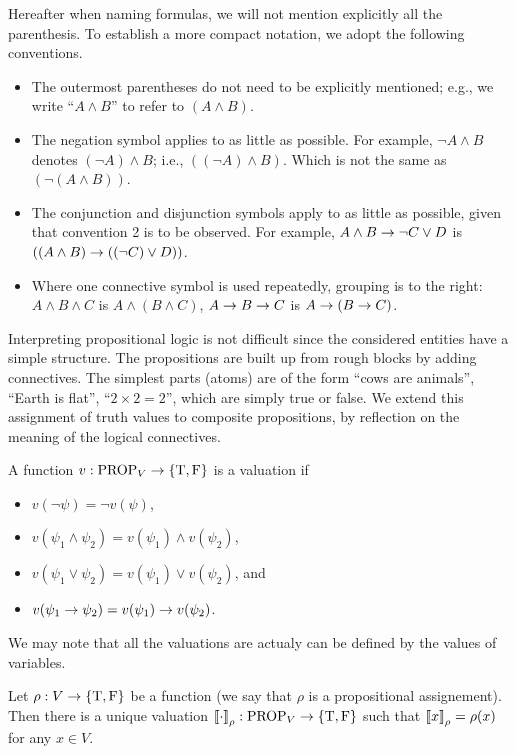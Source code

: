 Hereafter when naming formulas, we will not mention explicitly all the
parenthesis. To establish a more compact notation, we adopt the following
conventions.
\begin{itemize}
  \item The outermost parentheses do not need to be explicitly mentioned; e.g.,
    we write ``$A \land B$'' to refer to $(A \land B)$.
  \item The negation symbol applies to as little as possible.
    For example, $\lnot A \land B$ denotes $(\lnot A) \land B$;
    i.e., $((\lnot A) \land B)$. Which is not the same as
    $(\lnot (A \land B))$.
  \item The conjunction and disjunction symbols apply to as little as possible,
    given that convention 2 is to be observed. For example,
    $A \land B \rightarrow \lnot C \lor D$ is
    $((A \land B) \rightarrow ((\lnot C) \lor D))$.
  \item Where one connective symbol is used repeatedly, grouping is to the
    right: $A \land B \land C$ is $A \land (B \land C)$,
    $A \rightarrow B \rightarrow C$ is $A \rightarrow (B \rightarrow C)$.
\end{itemize}

Interpreting propositional logic is not difficult since the
considered entities have a simple structure. The propositions are built up from
rough blocks by adding connectives.
The simplest parts (atoms) are of the form ``cows are animals'', ``Earth is flat'', ``$2 \times 2 = 2$'', which are simply true or false.
We extend this assignment of truth values to composite propositions,
by reflection on the meaning of the logical connectives.

\begin{definition}
  A function $v : \prop{V} \to \set{\ltrue, \lfalse}$ is a valuation if
  \begin{itemize}
    \item $v(\lnot \psi) = \lnot v(\psi)$,
    \item $v(\psi_1 \land \psi_2) = v(\psi_1) \land v(\psi_2)$,
    \item $v(\psi_1 \lor \psi_2) = v(\psi_1) \lor v(\psi_2)$, and
    \item $v(\psi_1 \rightarrow \psi_2) = v(\psi_1) \rightarrow v(\psi_2)$.
  \end{itemize}
\end{definition}

We may note that all the valuations are actualy can be defined by the values
of variables.
\begin{theorem}
  Let $\rho : V \to \set{\ltrue, \lfalse}$ be a function (we say that $\rho$ is
  a propositional assignement). Then there is a unique valuation
  $\substitute{\cdot}{\rho} : \prop{V} \to \set{\ltrue, \lfalse}$ such that
  $\left\llbracket {x} \right\rrbracket_{\rho} = \rho(x)$ for any $x \in V$.
\end{theorem}

